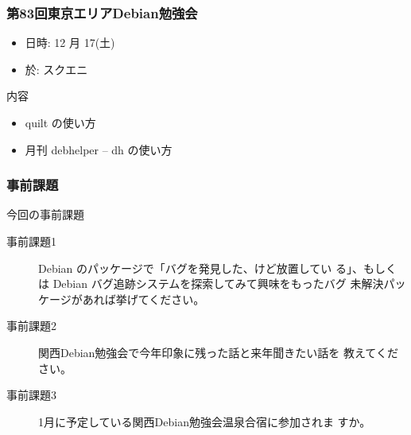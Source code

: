 \documentclass[cjk,dvipdfmx,10pt,%
hyperref={bookmarks=true,bookmarksnumbered=true,bookmarksopen=false,%
colorlinks=false,%
pdftitle={第 54 回 関西 Debian 勉強会},%
pdfauthor={倉敷・のがた・佐々木},%
pdfsubject={資料},%
}]{beamer}
\begin{document}
\begin{frame}[fragile]
  \frametitle{第83回東京エリアDebian勉強会}
  \begin{itemize}
  \item 日時: 12 月 17(土)
  \item 於: スクエニ
  \end{itemize}
  \begin{block}{内容}
    \begin{itemize}
    \item quilt の使い方
    \item 月刊 debhelper -- dh の使い方
    \end{itemize}
  \end{block}
\end{frame}




\begin{frame}[fragile]
\frametitle{事前課題}

\begin{block}{今回の事前課題}
  \begin{description}
  \item[事前課題1] Debian のパッケージで「バグを発見した、けど放置してい
    る」、もしくは Debian バグ追跡システムを探索してみて興味をもったバグ
    未解決パッケージがあれば挙げてください。
  \item[事前課題2] 関西Debian勉強会で今年印象に残った話と来年聞きたい話を
    教えてください。
  \item [事前課題3] 1月に予定している関西Debian勉強会温泉合宿に参加されま
    すか。
  \end{description}
\end{block}
\end{frame}

\end{document}
